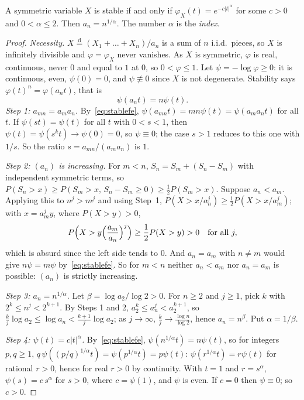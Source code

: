 \begin{theorem}\label{thm:stable}
A symmetric variable $X$ is stable if and only if $\varphi_X(t)=e^{-c|t|^\alpha}$ for some $c>0$ and $0<\alpha\le2$. Then $a_n=n^{1/\alpha}$. The number $\alpha$ is the
\emph{index}.
\end{theorem}
\begin{proof}
\emph{Necessity.} $X\overset{\mathrm d}=(X_1+\dots+X_n)/a_n$ is a sum of $n$ i.i.d.\ pieces, so $X$ is infinitely divisible and $\varphi=\varphi_X$ never vanishes. As $X$ is
symmetric, $\varphi$ is real, continuous, never $0$ and equal to $1$ at $0$, so $0<\varphi\le1$. Let $\psi=-\log\varphi\ge0$: it is continuous, even, $\psi(0)=0$,
and $\psi\not\equiv0$ since $X$ is not degenerate. Stability says $\varphi(t)^n=\varphi(a_nt)$, that is
\begin{equation}\label{eq:stablefe}
\psi(a_nt)=n\psi(t).
\end{equation}
\emph{Step 1: $a_{mn}=a_ma_n$.} By~\eqref{eq:stablefe}, $\psi(a_{mn}t)=mn\psi(t)=\psi(a_ma_nt)$ for all $t$. If $\psi(st)=\psi(t)$ for all $t$ with $0<s<1$, then
$\psi(t)=\psi(s^kt)\to\psi(0)=0$, so $\psi\equiv0$; the case $s>1$ reduces to this one with $1/s$. So the ratio $s=a_{mn}/(a_ma_n)$ is $1$.

\emph{Step 2: $(a_n)$ is increasing.} For $m<n$, $S_n=S_m+(S_n-S_m)$ with independent symmetric terms, so $P(S_n>x)\ge P(S_m>x,\,S_n-S_m\ge0)\ge\frac12P(S_m>x)$.
Suppose $a_n<a_m$. Applying this to $n^j>m^j$ and using Step~1, $P(X>x/a_n^j)\ge\frac12P(X>x/a_m^j)$; with $x=a_m^jy$, where $P(X>y)>0$,
\[
P\Bigl(X>y\Bigl(\frac{a_m}{a_n}\Bigr)^j\Bigr)\ge\frac12P(X>y)>0\quad\text{for all }j,
\]
which is absurd since the left side tends to $0$. And $a_n=a_m$ with $n\ne m$ would give $n\psi=m\psi$ by~\eqref{eq:stablefe}. So for $m<n$ neither $a_n<a_m$ nor $a_n=a_m$ is
possible: $(a_n)$ is strictly increasing.

\emph{Step 3: $a_n=n^{1/\alpha}$.} Let $\beta=\log a_2/\log2>0$. For $n\ge2$ and $j\ge1$, pick $k$ with $2^k\le n^j<2^{k+1}$. By Steps 1 and 2,
$a_2^k\le a_n^j<a_2^{k+1}$, so $\frac kj\log a_2\le\log a_n<\frac{k+1}j\log a_2$; as $j\to\infty$, $\frac kj\to\frac{\log n}{\log2}$, hence $a_n=n^\beta$. Put $\alpha=1/\beta$.

\emph{Step 4: $\psi(t)=c|t|^\alpha$.} By~\eqref{eq:stablefe}, $\psi(n^{1/\alpha}t)=n\psi(t)$, so for integers $p,q\ge1$,
$q\,\psi((p/q)^{1/\alpha}t)=\psi(p^{1/\alpha}t)=p\psi(t)$: $\psi(r^{1/\alpha}t)=r\psi(t)$ for rational $r>0$, hence for real $r>0$ by continuity. With $t=1$ and $r=s^\alpha$,
$\psi(s)=c\,s^\alpha$ for $s>0$, where $c=\psi(1)$, and $\psi$ is even. If $c=0$ then $\psi\equiv0$; so $c>0$.


\end{proof}
